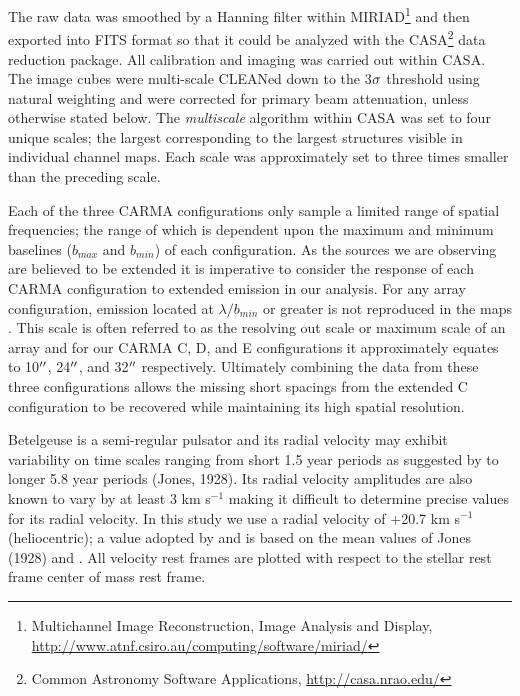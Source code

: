 \documentclass[preprint2]{aastex}
\begin{document}
The raw data was smoothed by a Hanning filter within MIRIAD\footnote{Multichannel Image Reconstruction, Image Analysis and Display, \url{http://www.atnf.csiro.au/computing/software/miriad/}} and then exported into FITS format so that it could be analyzed with the CASA\footnote{Common Astronomy Software Applications, \url{http://casa.nrao.edu/}} data reduction package. All calibration and imaging was carried out within CASA. The image cubes  were multi-scale  CLEANed down to the 3$\rm{\sigma}$ threshold using natural weighting and were corrected for primary beam attenuation, unless otherwise stated below. The \textit{multiscale} algorithm \citep{2008AJ....136.2897R} within CASA was set to four unique scales; the largest corresponding to the largest structures visible in individual channel maps. Each scale was approximately set to three times smaller than the preceding scale. 

Each of the three CARMA configurations only sample a limited range of spatial frequencies; the range of which is dependent upon the maximum and minimum baselines ($b_{max}$ and $b_{min}$) of each configuration. As the sources we are observing are believed to be extended it is imperative to consider the response of each CARMA configuration to extended emission in our analysis. For any array configuration, emission located at $\lambda/b_{min}$ or greater is not reproduced in the maps \citep{1999ASPC..180.....T}. This scale is often referred to as the resolving out scale or maximum scale of an array and for our CARMA C, D, and E configurations it approximately equates to 10$\mbox{$^{\prime\prime}$}$, 24$\mbox{$^{\prime\prime}$}$, and 32$\mbox{$^{\prime\prime}$}$ respectively. Ultimately combining the data from these three configurations allows the missing short spacings from the extended C configuration to be recovered while maintaining its high spatial resolution.

Betelgeuse is a  semi-regular pulsator and its radial velocity may exhibit variability on time scales ranging from short 1.5 year periods as suggested by \cite{1931PWasO..15..178S} to longer 5.8 year periods (Jones, 1928). Its radial velocity amplitudes are also known to vary by at least 3 km s${}^{-1}$ \citep{1989AJ.....98.2233S} making it difficult to determine precise values for its radial velocity. In this study we use a radial velocity of +20.7 km s${}^{-1}$ (heliocentric); a value adopted by \citet{2008AJ....135.1430H} and is based on the mean values of Jones (1928) and \cite{1933CMWCI.464....1S}. All velocity rest frames are plotted with respect to the stellar rest frame center of mass rest frame. 
\end{document}

